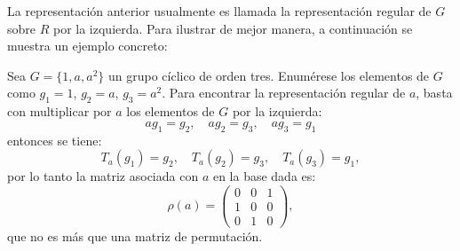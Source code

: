 La representación anterior usualmente es llamada la representación regular de $G$ sobre $R$ por la izquierda. Para ilustrar de mejor manera, a continuación se muestra un ejemplo concreto:
\begin{ejemplo}
Sea $G = \{ 1,a,a^2 \}$ un grupo cíclico de orden tres. Enumérese los elementos de $G$ como $g_1 = 1$, $g_2 = a$, $g_3 = a^2$. Para encontrar la representación regular de $a$, basta con multiplicar por $a$ los elementos de $G$ por la izquierda:
\[ag_1 = g_2, \quad ag_2 = g_3, \quad ag_3 = g_1 
\]
entonces se tiene:
\[T_a(g_1) = g_2, \quad T_a(g_2) = g_3, \quad T_a(g_3) = g_1, \] 
por lo tanto la matriz asociada con $a$ en la base dada es:
\begin{equation*} \rho(a) =  \begin{pmatrix}
0 & 0 & 1 \\
1 & 0 & 0 \\
0 & 1 & 0
\end{pmatrix},  \end{equation*} que no es más que una matriz de permutación.
\end{ejemplo}
